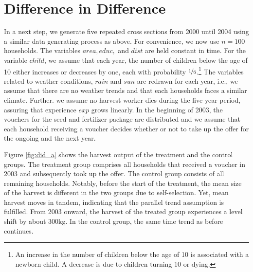 \section{Difference in Difference} \label{sec:difference}



In a next step, we generate five repeated cross sections from 2000 until 2004 using a similar data generating process as above. For convenience, we now use $n=100$ households. The variables $area, educ,$ and $dist$ are held constant in time. For the variable $child$, we assume that each year, the number of children below the age of 10 either increases or decreases by one, each with probability $\nicefrac{1}{6}$.\footnote{An increase in the number of children below the age of 10 is associated with a newborn child. A decrease is due to children turning 10 or dying.} The variables related to weather conditions, $rain$ and $sun$ are redrawn for each year, i.e., we assume that there are no weather trends and that each households faces a similar climate. Further. we assume no harvest worker dies during the five year period, assuring that experience $exp$ grows linearly. In the beginning of 2003, the vouchers for the seed and fertilizer package are distributed and we assume that each household receiving a voucher decides whether or not to take up the offer for the ongoing and the next year.


Figure \ref{fig:did_a} shows the harvest output of the treatment and the control groups. The treatment group comprises all households that received a voucher in 2003 and subsequently took up the offer. The control group consists of all remaining households. Notably, before the start of the treatment, the mean size of the harvest is different in the two groups due to self-selection. Yet, mean harvest moves in tandem, indicating that the parallel trend assumption is fulfilled. From 2003 onward, the harvest of the treated group experiences a level shift by about 300kg. In the control group, the same time trend as before continues.

